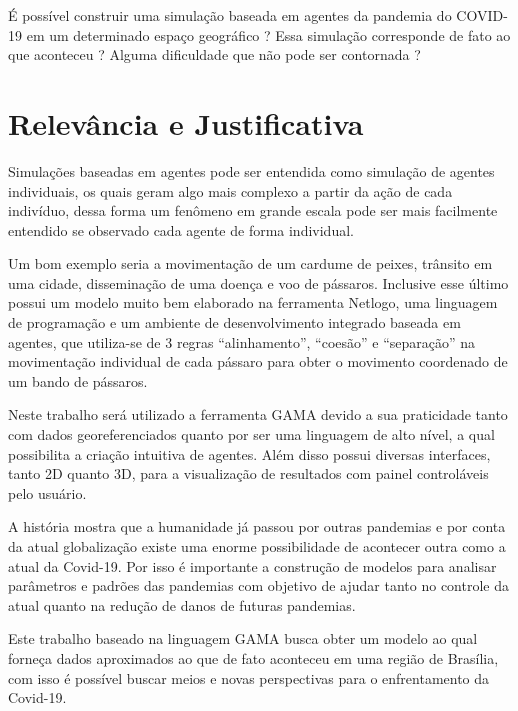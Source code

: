 É possível construir uma simulação baseada em agentes da pandemia do COVID-19 em um determinado espaço geográfico ?  Essa simulação corresponde de fato ao que aconteceu ? Alguma dificuldade que não pode ser contornada ?


\section{Relevância e Justificativa}%

Simulações baseadas em agentes pode ser entendida como simulação de agentes individuais, os quais geram algo mais complexo a partir da ação de cada indivíduo, dessa forma um fenômeno em grande escala pode ser mais facilmente entendido se observado cada agente de forma individual.

Um bom exemplo seria a movimentação de um cardume de peixes, trânsito em uma cidade, disseminação de uma doença e voo de pássaros. Inclusive esse último possui um modelo muito bem elaborado na ferramenta Netlogo, uma linguagem de programação e um ambiente de desenvolvimento integrado baseada em agentes, que utiliza-se de 3 regras “alinhamento”, “coesão” e “separação” na movimentação individual de cada pássaro para obter o movimento coordenado de um bando de pássaros.

Neste trabalho será utilizado a ferramenta GAMA devido a sua praticidade tanto com dados georeferenciados quanto por ser uma linguagem de alto nível, a qual possibilita a criação intuitiva de agentes. Além disso possui diversas interfaces, tanto 2D quanto 3D, para a visualização de resultados com painel controláveis pelo usuário.

A história mostra que a humanidade já passou por outras pandemias e por conta da atual globalização existe uma enorme possibilidade de acontecer outra como a atual da Covid-19. Por isso é importante a construção de modelos para analisar parâmetros e padrões das pandemias com objetivo de ajudar tanto no controle da atual quanto na redução de danos de futuras pandemias. 

Este trabalho baseado na linguagem GAMA busca obter um modelo ao qual forneça dados aproximados ao que de fato aconteceu em uma região de Brasília, com isso é possível buscar meios e novas perspectivas para o enfrentamento da Covid-19.

